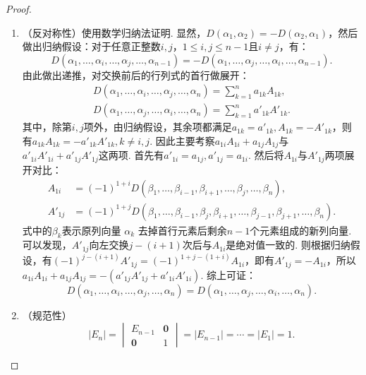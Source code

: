 \begin{proof}
\begin{enumerate}
\begin{enumerate}
                \item （反对称性）使用数学归纳法证明. 显然，$D(\alpha_1,\alpha_2)=-D(\alpha_2,\alpha_1)$，然后做出归纳假设：对于任意正整数$i,j$，$1 \leqslant i, j \leqslant n - 1$且$i \neq j$，有：
                    \[ D(\alpha_1,\ldots,\alpha_i,\ldots,\alpha_j,\ldots,\alpha_{n-1})=-D(\alpha_1,\ldots,\alpha_j,\ldots,\alpha_i,\ldots,\alpha_{n-1}). \]
                    由此做出递推，对交换前后的行列式的首行做展开：
                    \begin{gather*}
                        D(\alpha_1,\ldots,\alpha_{i},\ldots,\alpha_{j},\ldots,\alpha_n)
                         =\sum_{k=1}^{n}a_{1k}A_{1k},   \\
                        D(\alpha_1,\ldots,\alpha_{j},\ldots,\alpha_{i},\ldots,\alpha_n)
                         =\sum_{k=1}^{n}a'_{1k}A'_{1k}.
                    \end{gather*}
                    其中，除第$i,j$项外，由归纳假设，其余项都满足$a_{1k}=a'_{1k},A_{1k}=-A'_{1k}$，则有$a_{1k}A_{1k}=-a'_{1k}A'_{1k},k\neq i,j$. 因此主要考察$a_{1i}A_{1i}+a_{1j}A_{1j}$与$a'_{1i}A'_{1i}+a'_{1j}A'_{1j}$这两项. 首先有$a'_{1i}=a_{1j},a'_{1j}=a_{1i}$. 然后将$A_{1i}$与$A'_{1j}$两项展开对比：
                    \begin{align*}
                        A_{1i}  & =(-1)^{1+i} D(\beta_{1},\ldots,\beta_{i-1},\beta_{i+1},\ldots,\beta_{j},\ldots,\beta_{n}),                             \\
                        A'_{1j} & =(-1)^{1+j} D(\beta_{1},\ldots,\beta_{i-1},\beta_{j},\beta_{i+1},\ldots,\beta_{j-1},\beta_{j+1},\ldots,\beta_{n}).
                    \end{align*}
                    式中的$\beta_k$表示原列向量 $\alpha_k$ 去掉首行元素后剩余$n-1$个元素组成的新列向量. 可以发现，$A'_{1j}$向左交换$j-(i+1)$次后与$A_{1i}$是绝对值一致的. 则根据归纳假设，有$(-1)^{j-(i+1)}A'_{1j}=(-1)^{1+j-(1+i)}A_{1i}$，即有$A'_{1j}=-A_{1i}$，所以$a_{1i}A_{1i}+a_{1j}A_{1j}=-(a'_{1j}A'_{1j}+a'_{1i}A'_{1i})$. 综上可证：
                    \[ D(\alpha_1,\ldots,\alpha_{i},\ldots,\alpha_{j},\ldots,\alpha_n)=D(\alpha_1,\ldots,\alpha_{j},\ldots,\alpha_{i},\ldots,\alpha_n). \]

                \item （规范性）
                    \[
                        |E_n| = \begin{vmatrix}
                            E_{n-1}    & \mathbf{0} \\
                            \mathbf{0} & 1
                        \end{vmatrix} = |E_{n-1}| = \cdots = |E_1| = 1.
                    \]
            \end{enumerate}
    \end{enumerate}
\end{proof}


